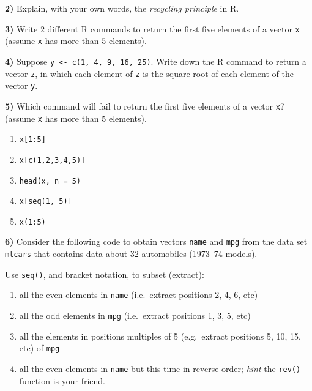 \documentclass[
]{book}
\newenvironment{Shaded}{\begin{snugshade}}{\end{snugshade}}
\newcommand{\CommentTok}[1]{\textcolor[rgb]{0.56,0.35,0.01}{\textit{#1}}}
\newcommand{\FunctionTok}[1]{\textcolor[rgb]{0.00,0.00,0.00}{#1}}
\newcommand{\NormalTok}[1]{#1}
\newcommand{\OtherTok}[1]{\textcolor[rgb]{0.56,0.35,0.01}{#1}}
\newcommand{\SpecialCharTok}[1]{\textcolor[rgb]{0.00,0.00,0.00}{#1}}
\begin{document}
\textbf{2)} Explain, with your own words, the \emph{recycling principle} in R.

\textbf{3)} Write 2 different R commands to return the first five elements of a
vector \texttt{x} (assume \texttt{x} has more than 5 elements).

\textbf{4)} Suppose \texttt{y\ \textless{}-\ c(1,\ 4,\ 9,\ 16,\ 25)}. Write down the R command to return a
vector \texttt{z}, in which each element of \texttt{z} is the square root of each element of
the vector \texttt{y}.

\textbf{5)} Which command will fail to return the first five elements of a vector
\texttt{x}? (assume \texttt{x} has more than 5 elements).

\begin{enumerate}
\def\labelenumi{\alph{enumi})}
\item
  \texttt{x{[}1:5{]}}
\item
  \texttt{x{[}c(1,2,3,4,5){]}}
\item
  \texttt{head(x,\ n\ =\ 5)}
\item
  \texttt{x{[}seq(1,\ 5){]}}
\item
  \texttt{x(1:5)}
\end{enumerate}

\textbf{6)} Consider the following code to obtain vectors \texttt{name} and \texttt{mpg} from the
data set \texttt{mtcars} that contains data about 32 automobiles (1973--74 models).

\begin{Shaded}
\end{Shaded}

Use \texttt{seq()}, and bracket notation, to subset (extract):

\begin{enumerate}
\def\labelenumi{\alph{enumi})}
\item
  all the even elements in \texttt{name} (i.e.~extract positions 2, 4, 6, etc)
\item
  all the odd elements in \texttt{mpg} (i.e.~extract positions 1, 3, 5, etc)
\item
  all the elements in positions multiples of 5 (e.g.~extract positions 5, 10,
  15, etc) of \texttt{mpg}
\item
  all the even elements in \texttt{name} but this time in reverse order; \emph{hint} the
  \texttt{rev()} function is your friend.
\end{enumerate}
\end{document}
